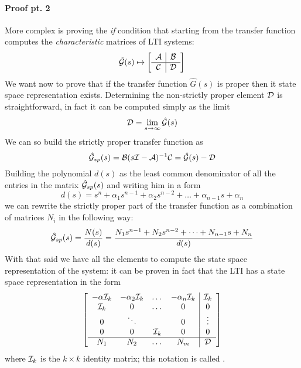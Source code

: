 		\paragraph{Proof pt. 2} More complex is proving the \textit{if} condition that starting from the transfer function computes the \textit{characteristic} matrices of LTI systems:
		\[ \hat {\mathcal{G}}(s) \mapsto \begin{bmatrix} \begin{array}{c|c}
				\mathcal{A} & \mathcal{B} \\ \hline \mathcal{C} & \mathcal{D}
		\end{array} \end{bmatrix}  \]
		We want now to prove that if the transfer function $\hat G(s)$ is proper then it state space representation exists. Determining the non-strictly proper element $\mathcal{D}$ is straightforward, in fact it can be computed simply as the limit
		\[ \mathcal D = \lim_{s\rightarrow \infty} \hat {\mathcal{G}}(s) \]
		We can so build the strictly proper transfer function as
		\[ \hat {\mathcal{G}}_{sp}(s) = \mathcal{B}(s\mathcal{I} - \mathcal{A})^{-1}\mathcal{C} = \hat {\mathcal{G}}(s) - \mathcal{D}\]
		Building the polynomial $d(s)$ as the least common denominator of all the entries in the matrix $\hat {\mathcal{G}}_{sp}(s)$ and writing him in a form
		\[ d(s) = s^n + \alpha_1 s^{n-1} + \alpha_2 s^{n-2}+ \dots + \alpha_{n-1} s + \alpha_n \]
		we can rewrite the strictly proper part of the transfer function as a combination of matrices $N_i$ in the following way:
		\[ \hat {\mathcal{G}}_{sp}(s) = \frac{N(s)}{d(s)} = \frac{N_1 s^{n-1} + N_2 s^{n-2} + \dots + N_{n-1} s + N_n }{d(s)} \]
		With that said we have all the elements to compute the state space representation of the system: it can be proven in fact that the LTI has a state space representation in the form
		\begin{equation} \label{eq:dyn:Gtostaterep}
			\begin{bmatrix} \begin{array}{ c c c c | c}
				-\alpha \mathcal{I}_k & - \alpha_2 \mathcal{I}_k & \dots & - \alpha_n \mathcal{I}_k & \mathcal{I}_k \\
				\mathcal{I}_k & 0 & \dots & 0 & 0 \\
				0 & \ddots & & 0 & \vdots \\
				0 & 0& \mathcal{I}_k & 0 & 0 \\ \hline
				N_1 & N_2 & \dots & N_m & \mathcal{D}
			\end{array} \end{bmatrix}
		\end{equation}
		where $\mathcal{I}_k$ is the $k\times k$ identity matrix; this notation is called .
		
